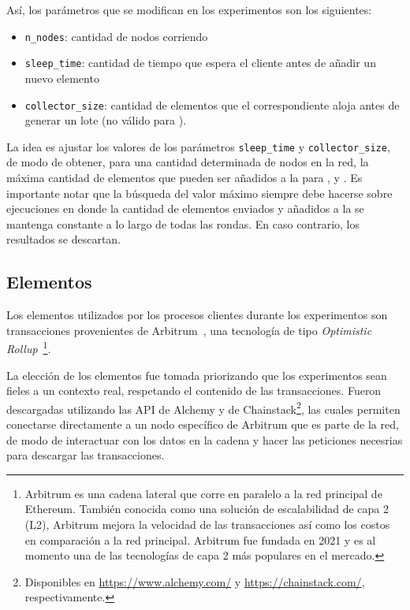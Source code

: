 Así, los parámetros que se modifican en los experimentos son los siguientes:
\begin{itemize}
	\item \texttt{n\_nodes}: cantidad de nodos corriendo
	\item \texttt{sleep\_time}: cantidad de tiempo que espera el cliente antes de añadir un nuevo elemento
	\item \texttt{collector\_size}: cantidad de elementos que el correspondiente \collector aloja antes de generar
	un lote (no válido para \vanilla).
\end{itemize}
La idea es ajustar los valores de los parámetros \texttt{sleep\_time} y \texttt{collector\_size},
de modo de obtener, para una cantidad determinada de nodos en la red, la máxima cantidad de elementos que pueden ser
añadidos a la \setchain para \vanilla, \compresschain y \hashchain.
Es importante notar que la búsqueda del valor máximo siempre debe hacerse sobre ejecuciones en donde la cantidad de elementos
enviados y añadidos a la \setchain se mantenga constante a lo largo de todas las rondas.
En caso contrario, los resultados se descartan.


\subsection{Elementos}
Los elementos utilizados por los procesos clientes durante los experimentos son transacciones provenientes
de Arbitrum~\cite{Kalodner2018Arbitrum}, una tecnología de tipo \textit{Optimistic Rollup}~\footnote{
Arbitrum es una cadena lateral que corre en paralelo a la red principal de Ethereum.
También conocida como una solución de escalabilidad de capa 2 (L2), Arbitrum mejora la velocidad de las transacciones así
como los costos en comparación a la red principal.
Arbitrum fue fundada en 2021 y es al momento una de las tecnologías de capa 2 más populares en el mercado.}.
%

La elección de los elementos fue tomada priorizando que los experimentos sean fieles a un contexto
real, respetando el contenido de las transacciones.
%
Fueron descargadas utilizando las API de Alchemy y de Chainstack\footnote{Disponibles en \url{https://www.alchemy.com/} y \url{https://chainstack.com/},
respectivamente.}, las
cuales permiten conectarse directamente a un nodo específico de Arbitrum que es parte de la red,
de modo de interactuar con los datos en la cadena y hacer las peticiones necesrias para descargar las transacciones.

